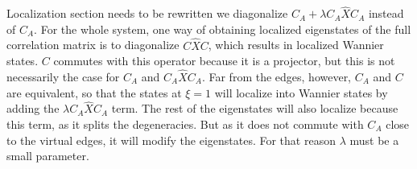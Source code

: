 \documentclass[twocolumn,amsmath,longbibliography,amssymb,superscriptaddress]{revtex4-1}
\newcommand{\carlos}[1]{{\color{red} #1}}
\newcommand{\mariac}[1]{{\it\color{cyan}#1}}
\begin{document}

{\color{red} Localization section needs to be rewritten}
we diagonalize $C_A + \lambda C_A\hat{X}C_A$ instead of $C_A$.
For the whole system, one way of obtaining localized eigenstates of the full correlation matrix is to diagonalize $C\hat{X}C$, which results in localized Wannier states. 
$C$ commutes with this operator because it is a projector, but this is not necessarily the case for $C_A$ and $C_A\hat{X}C_A$. 
Far from the edges, however, $C_A$ and $C$ are equivalent, so that the states at $\xi=1$ will localize into Wannier states by adding the $\lambda C_A\hat{X}C_A$ term.
The rest of the eigenstates will also localize because this term, as it splits the degeneracies. 
But as it does not commute with $C_A$ close to the virtual edges,  it will modify the eigenstates. 
For that reason $\lambda$ must be a small parameter. 
\end{document}
